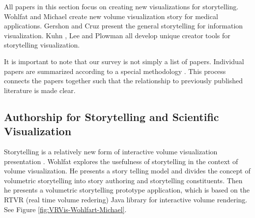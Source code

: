 \documentclass{egpubl}
\begin{document}
All papers in this section focus on creating new visualizations for storytelling. Wohlfat and Michael \cite{wohlfat} create new volume visualization story for medical applications. Gershon \cite{Gershon2} and Cruz \cite{cruz2011} present the general storytelling for information visualization. Kuhn \cite{kuhn2012}, Lee \cite{lee2013} and Plowman \cite{plowman1999} all develop unique creator tools for storytelling visualization. 

It is important to note that our survey is not simply a list of papers. Individual papers are summarized according to a special methodology \cite{laramee2011read}. This process connects the papers together such that the relationship to previously published literature is made clear.


\subsection{Authorship for  Storytelling and Scientific Visualization}
Storytelling is a relatively new form of interactive volume visualization presentation \cite{wohlfat}.
Wohlfat  explores the usefulness of storytelling in the context of volume visualization. He presents a story telling model and divides the concept of volumetric storytelling into story authoring and storytelling constituents. Then he presents a volumetric storytelling prototype application, which is based on the RTVR (real time volume redering) Java library \cite{mroz2001rtvr} for interactive volume rendering. See Figure \ref{fig:VRVis-Wohlfart-Michael}\cite{wohlfat}.
\end{document}
